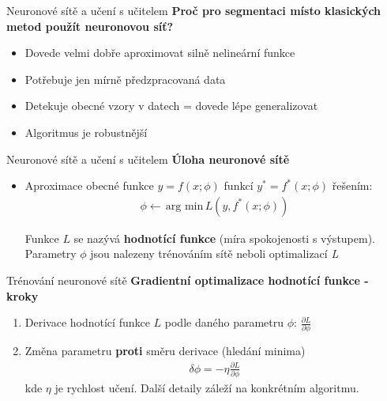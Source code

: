 \documentclass[aspectratio=1610]{beamer}
\begin{document}
\begin{frame}{Neuronové sítě a učení s učitelem}
\textbf{Proč pro segmentaci místo klasických metod použít neuronovou síť?}
\begin{itemize}
	\item Dovede velmi dobře aproximovat silně nelineární funkce
	\item Potřebuje jen mírně předzpracovaná data
	\item Detekuje obecné vzory v datech = dovede lépe generalizovat
	\item Algoritmus je robustnější
	
\end{itemize}
\end{frame}
\begin{frame}{Neuronové sítě a učení s učitelem}
\textbf{Úloha neuronové sítě}
\begin{itemize}
\item Aproximace obecné funkce $y=f(x;\phi)$ funkcí $ y^* = f^*(x;\phi)	$ řešením:
\vspace{3mm}					
\begin{gather}
\phi \leftarrow \, \text{arg min} \, L(y, f^*(x;\phi))	
\end{gather} 

Funkce $ L $ se nazývá \textbf{hodnotící funkce} (míra spokojenosti s výstupem). Parametry $ \phi $ jsou nalezeny trénováním sítě neboli optimalizací \textit{L}
\end{itemize}
\end{frame}
\begin{frame}{Trénování neuronové sítě}
\textbf{Gradientní optimalizace hodnotící funkce - kroky}
\begin{enumerate}
	\item Derivace hodnotící funkce $ L $ podle daného parametru $ \phi $: $ \frac{\partial L}{\partial \phi} $
	\item Změna parametru \textbf{proti} směru derivace (hledání minima)
	\begin{gather}
	\delta \phi = - \eta \frac{\partial L}{\partial \phi}
	\end{gather}	
	\noindent kde $ \eta $ je rychlost učení. Další detaily záleží na konkrétním algoritmu.	
\end{enumerate}
	\begin{center}		
\end{center}
\end{frame}
\end{document}
